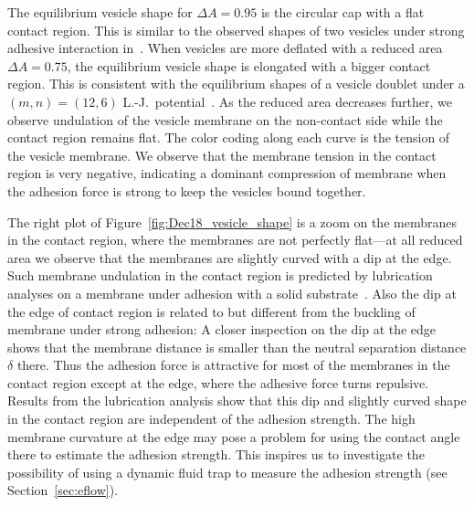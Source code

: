 \documentclass[prf,superscriptaddress,showpacs]{revtex4-1}
\begin{document}
The equilibrium vesicle shape for $\Delta A=0.95$ is the circular cap
with a flat contact region.  This is similar to the observed shapes of
two vesicles under strong adhesive interaction
in~\cite{RamachandranAndersonLealIsraelachvili2010_Langmuir}.  When
vesicles are more deflated with a reduced area $\Delta A = 0.75$, the
equilibrium vesicle shape is elongated with a bigger contact region.
This is consistent with the equilibrium shapes of a vesicle doublet
under a $(m,n) = (12,6)$
L.-J.~potential~\cite{FlormannAouane2017_SciReports}.  As the reduced
area decreases further, we observe undulation of the vesicle membrane on
the non-contact side while the contact region remains flat.  The color
coding along each curve is the tension of the vesicle membrane.  We
observe that the membrane tension in the contact region is very
negative, indicating a dominant compression of membrane when the
adhesion force is strong to keep the vesicles bound together.

The right plot of Figure~\ref{fig:Dec18_vesicle_shape} is a zoom on the
membranes in the contact region, where the membranes are not perfectly
flat---at all reduced area we observe that the membranes are slightly
curved with a dip at the edge.  Such membrane undulation in the contact
region is predicted by lubrication analyses on a membrane under adhesion
with a solid substrate~\cite{BlountMiksisDavis2013_PRSa,
YoungStone2017_PRF}.  Also the dip at the edge of contact region is
related to but different from the buckling of membrane under strong
adhesion: A closer inspection on the dip at the edge shows that the
membrane distance is smaller than the neutral separation distance
$\delta$ there. Thus the adhesion force is attractive for most of the
membranes in the contact region except at the edge, where the adhesive
force turns repulsive.  Results from the lubrication analysis show that
this dip and slightly curved shape in the contact region are independent
of the adhesion strength. The high membrane curvature at the edge may
pose a problem for using the contact angle there to estimate the
adhesion strength. This inspires us to investigate the possibility of
using a dynamic fluid trap to measure the adhesion strength (see
Section~\ref{sec:eflow}).
\end{document}
